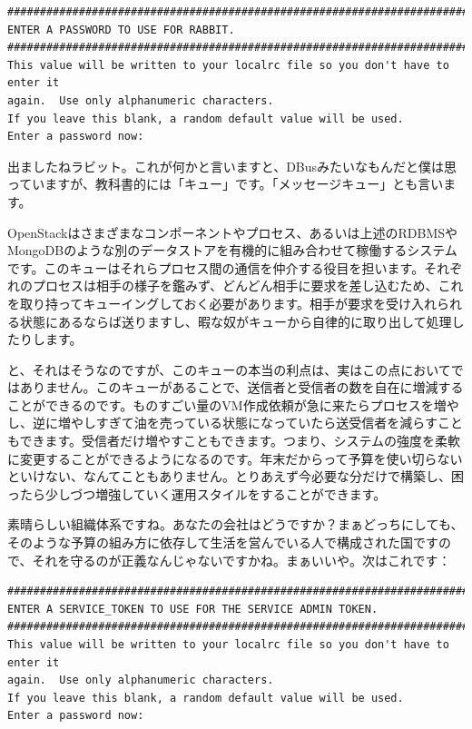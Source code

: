 \documentclass[9pt,b5paper,tombo,openany]{jsbook}
\begin{document}
\begin{lstlisting}
################################################################################
ENTER A PASSWORD TO USE FOR RABBIT.
################################################################################
This value will be written to your localrc file so you don't have to enter it
again.  Use only alphanumeric characters.
If you leave this blank, a random default value will be used.
Enter a password now:
\end{lstlisting}

出ましたねラビット。これが何かと言いますと、DBusみたいなもんだと僕は思っていますが、教科書的には「キュー」です。「メッセージキュー」とも言います。

OpenStackはさまざまなコンポーネントやプロセス、あるいは上述のRDBMSやMongoDBのような別のデータストアを有機的に組み合わせて稼働するシステムです。このキューはそれらプロセス間の通信を仲介する役目を担います。それぞれのプロセスは相手の様子を鑑みず、どんどん相手に要求を差し込むため、これを取り持ってキューイングしておく必要があります。相手が要求を受け入れられる状態にあるならば送りますし、暇な奴がキューから自律的に取り出して処理したりします。

と、それはそうなのですが、このキューの本当の利点は、実はこの点においてではありません。このキューがあることで、送信者と受信者の数を自在に増減することができるのです。ものすごい量のVM作成依頼が急に来たらプロセスを増やし、逆に増やしすぎて油を売っている状態になっていたら送受信者を減らすこともできます。受信者だけ増やすこともできます。つまり、システムの強度を柔軟に変更することができるようになるのです。年末だからって予算を使い切らないといけない、なんてこともありません。とりあえず今必要な分だけで構築し、困ったら少しづつ増強していく運用スタイルをすることができます。

素晴らしい組織体系ですね。あなたの会社はどうですか？まぁどっちにしても、そのような予算の組み方に依存して生活を営んでいる人で構成された国ですので、それを守るのが正義なんじゃないですかね。まぁいいや。次はこれです：

\begin{lstlisting}
################################################################################
ENTER A SERVICE_TOKEN TO USE FOR THE SERVICE ADMIN TOKEN.
################################################################################
This value will be written to your localrc file so you don't have to enter it
again.  Use only alphanumeric characters.
If you leave this blank, a random default value will be used.
Enter a password now:
\end{lstlisting}
\end{document}
